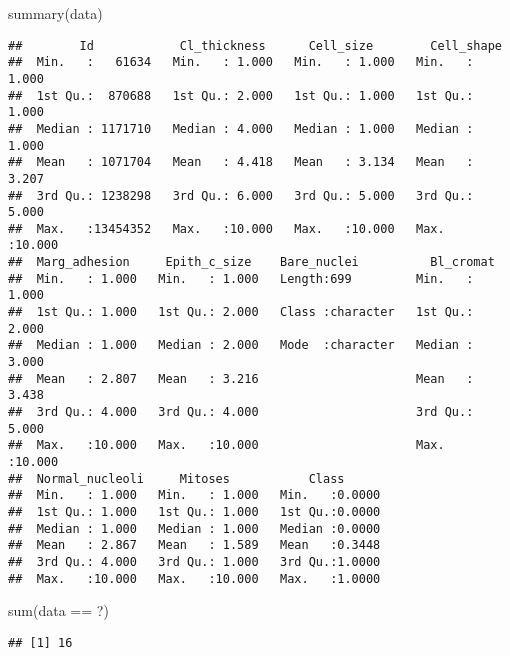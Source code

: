 \documentclass[
]{article}
\newenvironment{Shaded}{\begin{snugshade}}{\end{snugshade}}
\newcommand{\AttributeTok}[1]{\textcolor[rgb]{0.77,0.63,0.00}{#1}}
\newcommand{\ConstantTok}[1]{\textcolor[rgb]{0.00,0.00,0.00}{#1}}
\newcommand{\DecValTok}[1]{\textcolor[rgb]{0.00,0.00,0.81}{#1}}
\newcommand{\FunctionTok}[1]{\textcolor[rgb]{0.00,0.00,0.00}{#1}}
\newcommand{\NormalTok}[1]{#1}
\newcommand{\OtherTok}[1]{\textcolor[rgb]{0.56,0.35,0.01}{#1}}
\newcommand{\SpecialCharTok}[1]{\textcolor[rgb]{0.00,0.00,0.00}{#1}}
\newcommand{\StringTok}[1]{\textcolor[rgb]{0.31,0.60,0.02}{#1}}
\begin{document}
\begin{Shaded}
\begin{Highlighting}[]
\FunctionTok{summary}\NormalTok{(data)}
\end{Highlighting}
\end{Shaded}

\begin{verbatim}
##        Id            Cl_thickness      Cell_size        Cell_shape    
##  Min.   :   61634   Min.   : 1.000   Min.   : 1.000   Min.   : 1.000  
##  1st Qu.:  870688   1st Qu.: 2.000   1st Qu.: 1.000   1st Qu.: 1.000  
##  Median : 1171710   Median : 4.000   Median : 1.000   Median : 1.000  
##  Mean   : 1071704   Mean   : 4.418   Mean   : 3.134   Mean   : 3.207  
##  3rd Qu.: 1238298   3rd Qu.: 6.000   3rd Qu.: 5.000   3rd Qu.: 5.000  
##  Max.   :13454352   Max.   :10.000   Max.   :10.000   Max.   :10.000  
##  Marg_adhesion     Epith_c_size    Bare_nuclei          Bl_cromat     
##  Min.   : 1.000   Min.   : 1.000   Length:699         Min.   : 1.000  
##  1st Qu.: 1.000   1st Qu.: 2.000   Class :character   1st Qu.: 2.000  
##  Median : 1.000   Median : 2.000   Mode  :character   Median : 3.000  
##  Mean   : 2.807   Mean   : 3.216                      Mean   : 3.438  
##  3rd Qu.: 4.000   3rd Qu.: 4.000                      3rd Qu.: 5.000  
##  Max.   :10.000   Max.   :10.000                      Max.   :10.000  
##  Normal_nucleoli     Mitoses           Class       
##  Min.   : 1.000   Min.   : 1.000   Min.   :0.0000  
##  1st Qu.: 1.000   1st Qu.: 1.000   1st Qu.:0.0000  
##  Median : 1.000   Median : 1.000   Median :0.0000  
##  Mean   : 2.867   Mean   : 1.589   Mean   :0.3448  
##  3rd Qu.: 4.000   3rd Qu.: 1.000   3rd Qu.:1.0000  
##  Max.   :10.000   Max.   :10.000   Max.   :1.0000
\end{verbatim}

\begin{Shaded}
\begin{Highlighting}[]
\FunctionTok{sum}\NormalTok{(data }\SpecialCharTok{==} \StringTok{\textquotesingle{}?\textquotesingle{}}\NormalTok{)}
\end{Highlighting}
\end{Shaded}

\begin{verbatim}
## [1] 16
\end{verbatim}

\begin{Shaded}
\end{Shaded}
\end{document}
